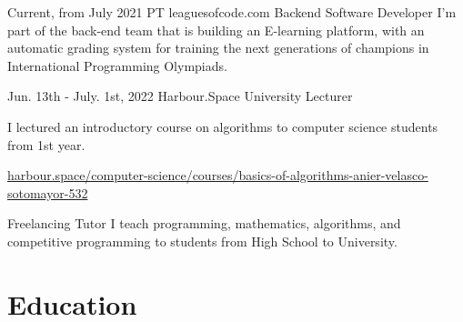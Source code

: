 \documentclass[
	10pt, %
]{FreemanCV}
\begin{document}
\begin{paracol}{2}


\jobentry
	{Current, from July 2021} %
	{PT} %
	{leaguesofcode.com} %
	{Backend Software Developer} %
	{I'm part of the back-end team that is building an E-learning platform, with an automatic grading system for training the next generations of champions in International Programming Olympiads.
    } %


\jobentry
	{Jun. 13th - July. 1st, 2022} %
	{} %
	{Harbour.Space University} %
	{Lecturer} %
	{I lectured an introductory course on algorithms to computer science students from 1st year.

	\href{https://harbour.space/computer-science/courses/basics-of-algorithms-anier-velasco-sotomayor-532}{harbour.space/computer-science/courses/basics-of-algorithms-anier-velasco-sotomayor-532} 

    } %


\jobentry
	{} %
	{} %
	{Freelancing} %
	{Tutor} %
	{I teach programming, mathematics, algorithms, and competitive programming to students from High School to University.
    } %


\section{Education} 





\end{paracol}
\end{document}

